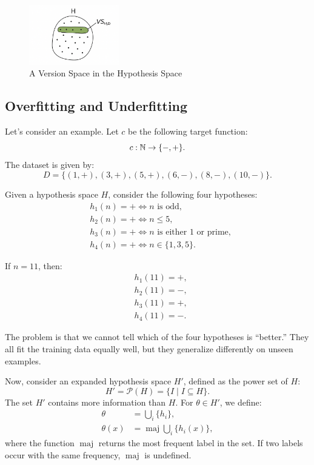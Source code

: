 \documentclass[10pt, letterpaper]{report}
\begin{document}
\bigskip
\begin{figure}[h!]
	\centering
	\includegraphics[width=0.35\textwidth]{images/VersionSpace.png}
	\caption{A Version Space in the Hypothesis Space}
	\label{img:VersionSpace}
\end{figure}

\subsection{Overfitting and Underfitting}

Let's consider an example. Let $c$ be the following target function:
\begin{equation}
	c:{\mathbb N}\rightarrow\{-,+\}.
\end{equation}
The dataset is given by:
\begin{equation}
	D=\{(1,+),(3,+),(5,+),(6,-),(8,-),(10,-)\}.
\end{equation}

Given a hypothesis space $H$, consider the following four hypotheses:
\begin{align*}
	 & h_1(n)=+\iff n\text{ is odd},               \\
	 & h_2(n)=+\iff n\le 5,                        \\
	 & h_3(n)=+\iff n\text{ is either 1 or prime}, \\
	 & h_4(n)=+\iff n\in\{1,3,5\}.
\end{align*}

If $n=11$, then:
\begin{align*}
	 & h_1(11)=+, \\
	 & h_2(11)=-, \\
	 & h_3(11)=+, \\
	 & h_4(11)=-.
\end{align*}

The problem is that we cannot tell which of the four hypotheses is “better.”
They all fit the training data equally well, but they generalize differently on unseen examples.

\bigskip
Now, consider an expanded hypothesis space $H'$, defined as the power set of $H$:
\begin{equation}
	H'=\mathcal P(H)=\{I \mid I\subseteq H\}.
\end{equation}
The set $H'$ contains more information than $H$. For $\theta \in H'$, we define:
\begin{align}
	\theta    & = \bigcup_i\{h_i\},                     \\
	\theta(x) & =\operatorname{maj}\bigcup_i\{h_i(x)\},
\end{align}
where the function $\operatorname{maj}$ returns the most frequent label in the set.
If two labels occur with the same frequency, $\operatorname{maj}$ is undefined.
\end{document}
